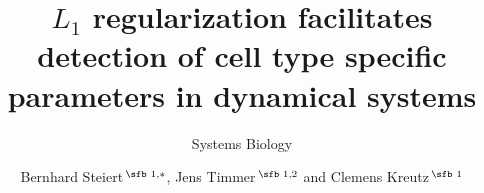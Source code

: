 \documentclass{bioinfo}
\newcommand{\boldm}[1] {\mathversion{bold}#1\mathversion{normal}}
\begin{document}

\subtitle{Systems Biology}

\title[$L_1$ regularization to detect differences between cell types]{{\boldm $L_1$} regularization facilitates detection of cell type specific parameters in dynamical systems}
\author[Steiert \textit{et~al}.]{Bernhard Steiert\,$^{\text{\sfb 1,}*}$, Jens Timmer\,$^{\text{\sfb 1,2}}$ and Clemens Kreutz\,$^{\text{\sfb 1}}$}
\address{$^{\text{\sf 1}}$Institute of Physics, University of Freiburg, Germany and \\
$^{\text{\sf 2}}$BIOSS Centre for Biological Signalling Studies, University of Freiburg, Germany.}


\end{document}
